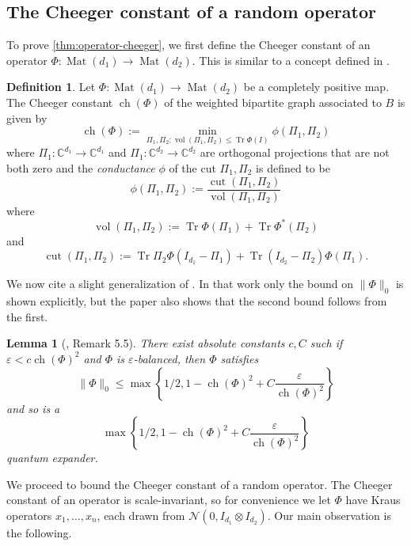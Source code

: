 \documentclass[aos]{imsart}
\newtheorem{lemma}[theorem]{Lemma}
\theoremstyle{definition}
\newtheorem{definition}{Definition}
\DeclareMathOperator{\vol}{vol}
\DeclareMathOperator{\cut}{cut}
\DeclareMathOperator{\ch}{ch}
\DeclareMathOperator{\mat}{Mat}
\DeclareMathOperator{\tr}{Tr}
\newcommand{\C}{{\mathbb{C}}}
\newcommand{\ot}{\otimes}
\newcommand{\eps}{\varepsilon}
\newcommand{\cN}{\mathcal{N}}
\newcommand{\samp}{x}
\begin{document}
\begin{appendix}
\section{The Cheeger constant of a random operator}
To prove \cref{thm:operator-cheeger}, we first define the Cheeger constant of an operator $\Phi:\mat(d_1) \to \mat(d_2)$. This is similar to a concept defined in \cite{H07}.
\begin{definition}
Let $\Phi : \mat(d_1) \to \mat(d_2)$ be a completely positive map. The Cheeger constant $\ch(\Phi)$ of the weighted bipartite graph associated to $B$ is given by
$$\ch(\Phi):=\min_{\Pi_1, \Pi_2: \vol(\Pi_1, \Pi_2) \leq \tr \Phi(I)} \phi(\Pi_1,\Pi_2)$$
where $\Pi_1: \C^{d_1} \to \C^{d_1}$ and $\Pi_1: \C^{d_2} \to \C^{d_2}$ are orthogonal projections that are not both zero and the \emph{conductance} $\phi$ of the cut $\Pi_1, \Pi_2$ is defined to be
$$\phi(\Pi_1,\Pi_2) := \frac{\cut(\Pi_1, \Pi_2)}{\vol(\Pi_1,\Pi_2)}$$
where
$$ \vol(\Pi_1,\Pi_2):=
\tr \Phi(\Pi_1) + \tr \Phi^*(\Pi_2)$$
and $$ \cut(\Pi_1, \Pi_2):= \tr \Pi_2 \Phi(I_{d_1} - \Pi_1) + \tr (I_{d_2} - \Pi_2) \Phi(\Pi_1).$$
\end{definition}

We now cite a slight generalization of \cite{FM20}. In that work only the bound on $\|\Phi\|_0$ is shown explicitly, but the paper also shows that the second bound follows from the first.

\begin{lemma} [\cite{FM20}, Remark 5.5]\label{lem:op-cheeger} There exist absolute constants $c, C$ such if $\eps < c \ch(\Phi)^2$ and $\Phi$ is $\eps$-balanced, then $\Phi$ satisfies 
$$\| \Phi\|_0 \leq \max\left\{1/2, 1 -  \ch(\Phi)^2 + C \frac{\eps}{\ch(\Phi)^2} \right\}$$ 
and so is a
$$ \max\left\{1/2, 1 -  \ch(\Phi)^2 + C \frac{\eps}{\ch(\Phi)^2} \right\}$$
quantum expander.
\end{lemma}
We proceed to bound the Cheeger constant of a random operator. The Cheeger constant of an operator is scale-invariant, so for convenience we let $\Phi$ have Kraus operators $\samp_1, \dots, \samp_n$, each drawn from $\cN(0,  I_{d_1} \ot I_{d_2}).$ Our main observation is the following.


\end{appendix}
\end{document}
